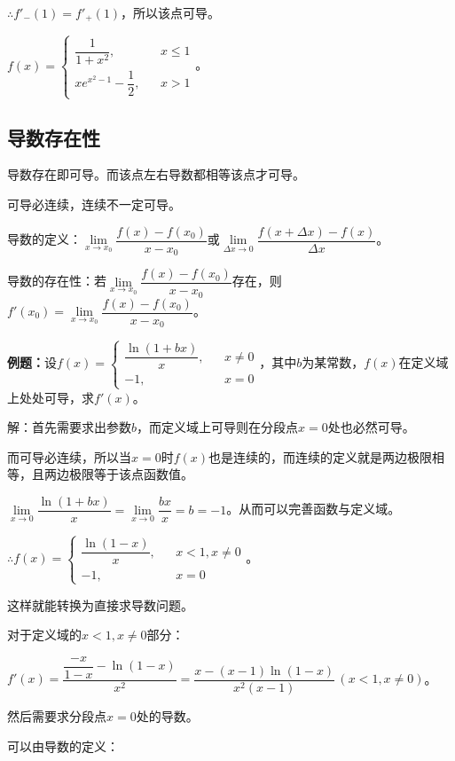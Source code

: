 \documentclass[UTF8, 12pt]{ctexart}
\begin{document}
$\therefore f'_-(1)=f'_+(1)$，所以该点可导。\medskip

$f(x)=\left\{\begin{array}{lcl}
    \dfrac{1}{1+x^2}, & & x\leqslant 1 \\
    xe^{x^2-1}-\dfrac{1}{2}, & & x>1
\end{array}
\right.$。

\subsection{导数存在性}

导数存在即可导。而该点左右导数都相等该点才可导。

可导必连续，连续不一定可导。

导数的定义：$\lim\limits_{x\to x_0}\dfrac{f(x)-f(x_0)}{x-x_0}$或$\lim\limits_{\Delta x\to 0}\dfrac{f(x+\Delta x)-f(x)}{\Delta x}$。

导数的存在性：若$\lim\limits_{x\to x_0}\dfrac{f(x)-f(x_0)}{x-x_0}$存在，则$f'(x_0)=\lim\limits_{x\to x_0}\dfrac{f(x)-f(x_0)}{x-x_0}$。\medskip

\textbf{例题：}设$f(x)=\left\{\begin{array}{lcl}
    \dfrac{\ln(1+bx)}{x}, & & x\neq 0 \\
    -1, & & x=0
\end{array}
\right.$，其中$b$为某常数，$f(x)$在定义域上处处可导，求$f'(x)$。

解：首先需要求出参数$b$，而定义域上可导则在分段点$x=0$处也必然可导。

而可导必连续，所以当$x=0$时$f(x)$也是连续的，而连续的定义就是两边极限相等，且两边极限等于该点函数值。\medskip

$\lim\limits_{x\to 0}\dfrac{\ln(1+bx)}{x}=\lim\limits_{x\to 0}\dfrac{bx}{x}=b=-1$。从而可以完善函数与定义域。\medskip

$\therefore f(x)=\left\{\begin{array}{lcl}
    \dfrac{\ln(1-x)}{x}, & & x<1,x\neq 0 \\
    -1, & & x=0
\end{array}
\right.$。

这样就能转换为直接求导数问题。

对于定义域的$x<1,x\neq 0$部分：\medskip

$f'(x)=\dfrac{\dfrac{-x}{1-x}-\ln(1-x)}{x^2}=\dfrac{x-(x-1)\ln(1-x)}{x^2(x-1)}\,(x<1,x\neq 0)$。

然后需要求分段点$x=0$处的导数。

可以由导数的定义：
\end{document}
